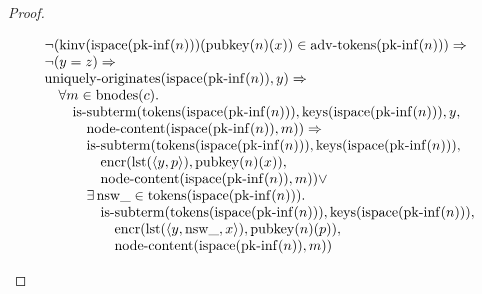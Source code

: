 \documentclass[11pt]{article}
\theoremstyle{plain}
\begin{document}
\begin{proof}
\begin{itemize}[leftmargin=2.8em, itemsep=4pt, parsep=1pt]
\begin{itemize}[leftmargin=2.8em, itemsep=4pt, parsep=1pt]
\begin{equation*}
\begin{array}{@{}l@{}}
\begin{array}{@{}l@{}} \neg (\operatorname{kinv}(\operatorname{ispace}(\operatorname{pk\text{-}inf}(n)))(\operatorname{pubkey}(n)(x)) \in \operatorname{adv\text{-}tokens}(\operatorname{pk\text{-}inf}(n))) \Rightarrow  \\ \neg (y = z) \Rightarrow  \\ \operatorname{uniquely\text{-}originates}(\operatorname{ispace}(\operatorname{pk\text{-}inf}(n)), y) \Rightarrow  \\ \quad \forall m \in \operatorname{bnodes}(c). \\ \quad \quad \operatorname{is\text{-}subterm}(\operatorname{tokens}(\operatorname{ispace}(\operatorname{pk\text{-}inf}(n))), \operatorname{keys}(\operatorname{ispace}(\operatorname{pk\text{-}inf}(n))), y, \\ \quad \quad \quad \operatorname{node\text{-}content}(\operatorname{ispace}(\operatorname{pk\text{-}inf}(n)), m)) \Rightarrow \\ \quad \quad \quad \operatorname{is\text{-}subterm}(\operatorname{tokens}(\operatorname{ispace}(\operatorname{pk\text{-}inf}(n))), \operatorname{keys}(\operatorname{ispace}(\operatorname{pk\text{-}inf}(n))), \\ \quad \quad \quad \quad \operatorname{encr}(\operatorname{lst}(\langle y, p \rangle), \operatorname{pubkey}(n)(x)), \\ \quad \quad \quad \quad \operatorname{node\text{-}content}(\operatorname{ispace}(\operatorname{pk\text{-}inf}(n)), m)) \vee \\ \quad \quad \quad \exists \operatorname{nsw\_} \in \operatorname{tokens}(\operatorname{ispace}(\operatorname{pk\text{-}inf}(n))). \\ \quad \quad \quad \quad \operatorname{is\text{-}subterm}(\operatorname{tokens}(\operatorname{ispace}(\operatorname{pk\text{-}inf}(n))), \operatorname{keys}(\operatorname{ispace}(\operatorname{pk\text{-}inf}(n))), \\ \quad \quad \quad \quad \quad \operatorname{encr}(\operatorname{lst}(\langle y, \operatorname{nsw\_}, x \rangle), \operatorname{pubkey}(n)(p)), \\ \quad \quad \quad \quad \quad \operatorname{node\text{-}content}(\operatorname{ispace}(\operatorname{pk\text{-}inf}(n)), m)) \end{array} \\

\end{array}
\end{equation*}
\end{itemize}
\end{itemize}
\end{proof}
\end{document}
